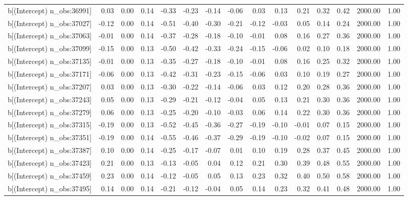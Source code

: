 \begin{table}[ht]
\begin{tabular}{rrrrrrrrrrrrrrr}
  b[(Intercept) n\_obs:36991] & 0.03 & 0.00 & 0.14 & -0.33 & -0.23 & -0.14 & -0.06 & 0.03 & 0.13 & 0.21 & 0.32 & 0.42 & 2000.00 & 1.00 \\ 
  b[(Intercept) n\_obs:37027] & -0.12 & 0.00 & 0.14 & -0.51 & -0.40 & -0.30 & -0.21 & -0.12 & -0.03 & 0.05 & 0.14 & 0.24 & 2000.00 & 1.00 \\ 
  b[(Intercept) n\_obs:37063] & -0.01 & 0.00 & 0.14 & -0.37 & -0.28 & -0.18 & -0.10 & -0.01 & 0.08 & 0.16 & 0.27 & 0.36 & 2000.00 & 1.00 \\ 
  b[(Intercept) n\_obs:37099] & -0.15 & 0.00 & 0.13 & -0.50 & -0.42 & -0.33 & -0.24 & -0.15 & -0.06 & 0.02 & 0.10 & 0.18 & 2000.00 & 1.00 \\ 
  b[(Intercept) n\_obs:37135] & -0.01 & 0.00 & 0.13 & -0.35 & -0.27 & -0.18 & -0.10 & -0.01 & 0.08 & 0.16 & 0.25 & 0.32 & 2000.00 & 1.00 \\ 
  b[(Intercept) n\_obs:37171] & -0.06 & 0.00 & 0.13 & -0.42 & -0.31 & -0.23 & -0.15 & -0.06 & 0.03 & 0.10 & 0.19 & 0.27 & 2000.00 & 1.00 \\ 
  b[(Intercept) n\_obs:37207] & 0.03 & 0.00 & 0.13 & -0.30 & -0.22 & -0.14 & -0.06 & 0.03 & 0.12 & 0.20 & 0.28 & 0.36 & 2000.00 & 1.00 \\ 
  b[(Intercept) n\_obs:37243] & 0.05 & 0.00 & 0.13 & -0.29 & -0.21 & -0.12 & -0.04 & 0.05 & 0.13 & 0.21 & 0.30 & 0.36 & 2000.00 & 1.00 \\ 
  b[(Intercept) n\_obs:37279] & 0.06 & 0.00 & 0.13 & -0.25 & -0.20 & -0.10 & -0.03 & 0.06 & 0.14 & 0.22 & 0.30 & 0.36 & 2000.00 & 1.00 \\ 
  b[(Intercept) n\_obs:37315] & -0.19 & 0.00 & 0.13 & -0.52 & -0.45 & -0.36 & -0.27 & -0.19 & -0.10 & -0.01 & 0.07 & 0.15 & 2000.00 & 1.00 \\ 
  b[(Intercept) n\_obs:37351] & -0.19 & 0.00 & 0.14 & -0.55 & -0.46 & -0.37 & -0.29 & -0.19 & -0.10 & -0.02 & 0.07 & 0.15 & 2000.00 & 1.00 \\ 
  b[(Intercept) n\_obs:37387] & 0.10 & 0.00 & 0.14 & -0.25 & -0.17 & -0.07 & 0.01 & 0.10 & 0.19 & 0.28 & 0.37 & 0.45 & 2000.00 & 1.00 \\ 
  b[(Intercept) n\_obs:37423] & 0.21 & 0.00 & 0.13 & -0.13 & -0.05 & 0.04 & 0.12 & 0.21 & 0.30 & 0.39 & 0.48 & 0.55 & 2000.00 & 1.00 \\ 
  b[(Intercept) n\_obs:37459] & 0.23 & 0.00 & 0.14 & -0.12 & -0.05 & 0.05 & 0.13 & 0.23 & 0.32 & 0.40 & 0.50 & 0.58 & 2000.00 & 1.00 \\ 
  b[(Intercept) n\_obs:37495] & 0.14 & 0.00 & 0.14 & -0.21 & -0.12 & -0.04 & 0.05 & 0.14 & 0.23 & 0.32 & 0.41 & 0.48 & 2000.00 & 1.00 \\ 

\end{tabular}
\end{table}
